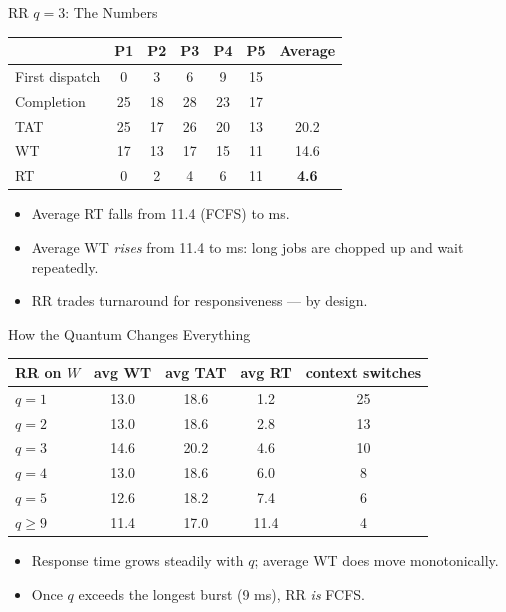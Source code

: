 \documentclass[aspectratio=169]{beamer}
\begin{document}
\begin{frame}{RR $q=3$: The Numbers}
  \centering
  \renewcommand{\arraystretch}{1.2}
  \begin{tabular}{lccccc|c}
    & P1 & P2 & P3 & P4 & P5 & \textbf{Average} \\ \hline
    First dispatch & 0 & 3 & 6 & 9 & 15 & \\
    Completion & 25 & 18 & 28 & 23 & 17 & \\
    TAT & 25 & 17 & 26 & 20 & 13 & 20.2 \\
    WT  & 17 & 13 & 17 & 15 & 11 & 14.6 \\
    RT  & 0 & 2 & 4 & 6 & 11 & \textbf{4.6} \\
  \end{tabular}
  \vspace{0.3cm}
  \begin{itemize}
    \item Average RT falls from 11.4 (FCFS) to  ms.
    \item Average WT \emph{rises} from 11.4 to  ms: long jobs are
      chopped up and wait repeatedly.
    \item RR trades turnaround for responsiveness --- by design.
  \end{itemize}
\end{frame}

\begin{frame}{How the Quantum Changes Everything}
  \centering
  \renewcommand{\arraystretch}{1.2}
  \begin{tabular}{lcccc}
    \textbf{RR on $W$} & \textbf{avg WT} & \textbf{avg TAT} &
    \textbf{avg RT} & \textbf{context switches} \\ \hline
    $q = 1$ & 13.0 & 18.6 & 1.2 & 25 \\
    $q = 2$ & 13.0 & 18.6 & 2.8 & 13 \\
    $q = 3$ & 14.6 & 20.2 & 4.6 & 10 \\
    $q = 4$ & 13.0 & 18.6 & 6.0 & 8 \\
    $q = 5$ & 12.6 & 18.2 & 7.4 & 6 \\
    $q \ge 9$ & 11.4 & 17.0 & 11.4 & 4 \\
  \end{tabular}
  \vspace{0.25cm}
  \begin{itemize}
    \item Response time grows steadily with $q$; average WT does
       move monotonically.
    \item Once $q$ exceeds the longest burst (9 ms), RR \emph{is} FCFS.
  \end{itemize}
\end{frame}
\end{document}
